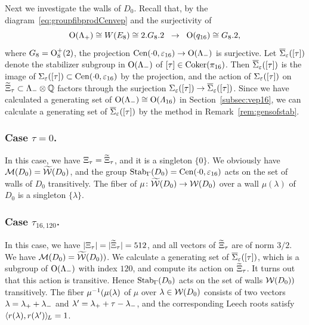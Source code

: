 \documentclass{amsart} %
\begin{document}
Next we investigate the walls of $D_0$.
Recall that, 
by 
the diagram~\eqref{eq:groupfibprodCenvep} and the surjectivity of 
\[
\mathord{\mathrm{O}}(\Lambda_{+})\cong W(E_8)\cong 2.G_8 . 2\;\;\to\;\; \mathord{\mathrm{O}}(q_{16})\cong G_8. 2,
\]
where $G_8=\mathord{\mathrm{O}}^+_{8} (2)$,
the projection
$\mathrm{Cen}(\cdot 0, \varepsilon_{16})\to \mathord{\mathrm{O}}(\Lambda_{-})$ is  surjective.
Let $\overline{\Sigma}_{\varepsilon} ([\tau])$  denote the stabilizer subgroup in $ \mathord{\mathrm{O}}(\Lambda_{-})$
of $[\tau]\in \operatorname{Coker}(\pi_{16})$.
Then $\overline{\Sigma}_{\varepsilon} ([\tau])$ is the image of $\Sigma_{\varepsilon} ([\tau])\subset \mathrm{Cen}(\cdot 0, \varepsilon_{16})$
by the projection, and 
the action of $\Sigma_{\varepsilon} ([\tau])$
on  $\widetilde{\Xi}_{\tau}\subset \Lambda_{-}\otimes \mathord{\mathbb{Q}}$ 
factors through the surjection $\Sigma_{\varepsilon} ([\tau])\to\overline{\Sigma}_{\varepsilon} ([\tau])$.
Since we have calculated a generating set of  $ \mathord{\mathrm{O}}(\Lambda_{-})\cong \mathord{\mathrm{O}}(\varLambda_{16})$
 in Section~\ref{subsec:vep16},
we can calculate a generating set of $\overline{\Sigma}_{\varepsilon} ([\tau])$
by the method in Remark~\ref{rem:gensofstab}.
%
\subsubsection{Case $\tau=0$.}
%
In this case,
we have $\Xi_{\tau}=\widetilde{\Xi}_{\tau}$,
and it is a singleton $\{0\}$.
We obviously have $\mathord{\mathcal{M}}(D_0)=\widetilde{\mathord{\mathcal{W}}}(D_0)$,
and the group $\operatorname{Stab}_{\Gamma}(D_0)=\mathrm{Cen}(\cdot 0, \varepsilon_{16})$ acts 
on the set of walls of $D_0$ transitively.
The fiber of  $\mu\colon \widetilde{\mathord{\mathcal{W}}}(D_0)\to\mathord{\mathcal{W}}(D_0)$ 
over a wall $\mu(\lambda)$  of $D_0$  is a  singleton $\{\lambda\}$.
%
%
\subsubsection{Case $\tau_{16, 120}$.}
%
In this case,
we have $|\Xi_{\tau}|=|\widetilde{\Xi}_{\tau}|=512$,
and all vectors of $\widetilde{\Xi}_{\tau}$ are of norm $3/2$.
We have $\mathord{\mathcal{M}}(D_0)=\widetilde{\mathord{\mathcal{W}}}(D_0))$.
We calculate a generating set of $\overline{\Sigma}_{\varepsilon} ([\tau])$,
which is a subgroup of $ \mathord{\mathrm{O}}(\Lambda_{-})$ with index $120$,
and compute its action on  $\widetilde{\Xi}_{\tau}$.
It turns out that this action is transitive.
Hence $\operatorname{Stab}_{\Gamma}(D_0)$ acts on the set of walls  $\mathord{\mathcal{W}}(D_0))$ transitively.
The fiber 
 $\mu^{-1}(\mu(\lambda)$ of $\mu$ over $\lambda\in \mathord{\mathcal{W}}(D_0)$ consists 
of two vectors
$\lambda={\lambda}_{+}+{\lambda}_{-}$ and $\lambda^{\prime}={\lambda}_{+}+\tau-{\lambda}_{-}$, and 
the corresponding Leech roots 
 satisfy
$\langle r(\lambda), r(\lambda^{\prime}) \rangle_{\hskip -1pt L}=1$.
%
\end{document}
